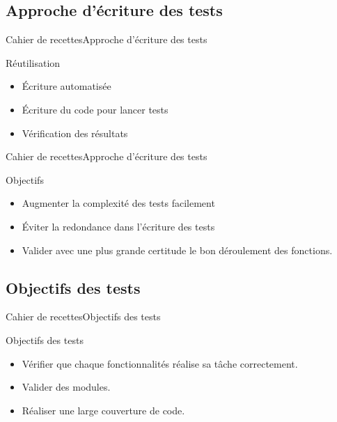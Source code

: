     \subsection{Approche d'écriture des tests}
      \begin{frame}{Cahier de recettes}{Approche d'écriture des tests}
        \begin{block}{Réutilisation}
          \begin{itemize}
            \item<1-> Écriture automatisée
            \item<2-> Écriture du code pour lancer tests
            \item<3-> Vérification des résultats
          \end{itemize}
        \end{block}
      \end{frame}
      \begin{frame}{Cahier de recettes}{Approche d'écriture des tests}
        \begin{block}{Objectifs}
          \begin{itemize}
            \item<1-> Augmenter la complexité des tests facilement
            \item<2-> Éviter la redondance dans l'écriture des tests
            \item<3-> Valider avec une plus grande certitude le bon déroulement des fonctions.
          \end{itemize}
        \end{block}
      \end{frame}

      \subsection{Objectifs des tests}
      \begin{frame}{Cahier de recettes}{Objectifs des tests}
        \begin{block}{Objectifs des tests}
          \begin{itemize}
            \item<1-> Vérifier que chaque fonctionnalités réalise sa tâche correctement.
            \item<2-> Valider des modules.
            \item<3-> Réaliser une large couverture de code.
          \end{itemize}
        \end{block}
      \end{frame}  
